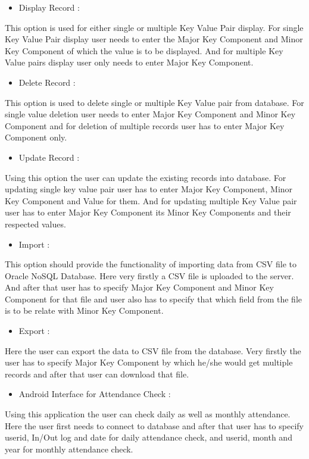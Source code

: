\begin{itemize}
  \item Display Record :
\end{itemize}
This option is used for either single or multiple Key Value Pair display. For single Key Value Pair display user needs to enter the Major Key Component and Minor Key Component of which the value is to be displayed. And for multiple Key Value pairs display user only needs to enter Major Key Component.

\begin{itemize}
  \item Delete Record :
\end{itemize}
This option is used to delete single or multiple Key Value pair from database. For single value deletion user needs to enter Major Key Component and Minor Key Component and for deletion of multiple records user has to enter Major Key Component only.

\begin{itemize}
  \item Update Record :
\end{itemize}
Using this option the user can update the existing records into database. For updating single key value pair user has to enter Major Key Component, Minor Key Component and Value for them. And for updating multiple Key Value pair user has to enter Major Key Component its Minor Key Components and their respected values.

\begin{itemize}
  \item Import :
\end{itemize}
This option should provide the functionality of importing data from CSV file to Oracle NoSQL Database. Here very firstly a CSV file is uploaded to the server. And after that user has to specify Major Key Component and Minor Key Component for that file and user also has to specify that which field from the file is to be relate with Minor Key Component.

\begin{itemize}
  \item Export :
\end{itemize}
Here the user can export the data to CSV file from the database. Very firstly the user has to specify Major Key Component by which he/she would get multiple records and after that user can download that file.

\begin{itemize}
  \item Android Interface for Attendance Check :
\end{itemize}
Using this application the user can check daily as well as monthly attendance. Here the user first needs to connect to database and after that user has to specify userid, In/Out log and date for daily attendance check, and userid, month and year for monthly attendance check.

